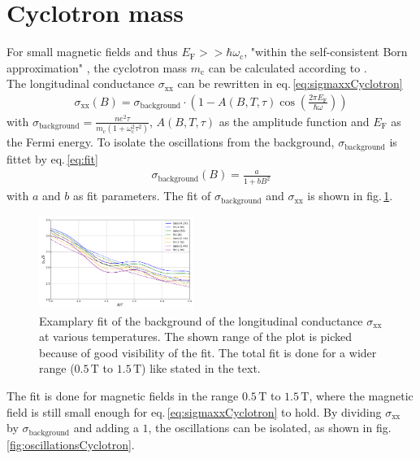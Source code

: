 \section{Cyclotron mass}
For small magnetic fields and thus $E_\text{F}>>\hbar\omega_\text{c}$, "within the self-consistent Born approximation" \cite{Tasksheet}, the cyclotron mass $m_\text{c}$ can be calculated according to \cite{Ando}.\\ The longitudinal conductance $\sigma_\text{xx}$ \cite{Ando} can be rewritten in eq.\,\ref{eq:sigmaxxCyclotron}
\begin{align}
    \sigma_\text{xx}(B) = \sigma_\text{background}\cdot\left(1-A(B,T,\tau)\cos{\left(\frac{2\pi E_\text{F}}{\hbar\omega}\right)}\right) \label{eq:sigmaxxCyclotron}
\end{align} 
with $\sigma_\text{background}=\frac{ne^2\tau}{m_\text{c}(1+\omega_\text{c}^2\tau^2)}$, $A(B,T,\tau)$ 
as the amplitude function and $E_\text{F}$ as the Fermi energy.
To isolate the oscillations from the background, $\sigma_\text{background}$ is fittet by eq.\,\ref{eq:fit}
\begin{align}
    \sigma_\text{background}(B) = \frac{a}{1+bB^2}
    \label{eq:fit}
\end{align}
with $a$ and $b$ as fit parameters. The fit of $\sigma_\text{background}$ and $\sigma_\text{xx}$ is shown in fig.\,\ref{fig:fitCyclotron}.
\begin{figure}[h]
    \centering
    \includegraphics[width=0.45\textwidth]{../Images/sigmaWithFit.png}
    \caption{Examplary fit of the background of the longitudinal conductance $\sigma_\text{xx}$ at various temperatures. 
    The shown range of the plot is picked because of good visibility of the fit. The total fit is done for a wider range ($0.5\,\text{T}$ to $1.5\,\text{T}$) like stated in the text.}
    \label{fig:fitCyclotron}
\end{figure}
The fit is done for magnetic fields in the range $0.5\,\text{T}$ to $1.5\,\text{T}$, where the magnetic field is still small enough for eq.\,\ref{eq:sigmaxxCyclotron} to hold.
By dividing $\sigma_\text{xx}$ by $\sigma_\text{background}$ and adding a $1$, the oscillations can be isolated, as shown in fig.\,\ref{fig:oscillationsCyclotron}.
